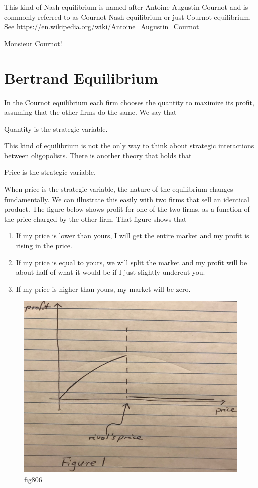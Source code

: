 \documentclass[
]{book}
\providecommand{\tightlist}{%
  \setlength{\itemsep}{0pt}\setlength{\parskip}{0pt}}
\begin{document}
This kind of Nash equilibrium is named after Antoine Augustin Cournot and is commonly referred to as Cournot Nash equilibrium or just Cournot equilibrium. See \url{https://en.wikipedia.org/wiki/Antoine_Augustin_Cournot}

Monsieur Cournot!

\hypertarget{bertrand-equilibrium}{%
\section{Bertrand Equilibrium}\label{bertrand-equilibrium}}

In the Cournot equilibrium each firm chooses the quantity to maximize its profit, assuming that the other firms do the same. We say that

\begin{center}
Quantity is the strategic variable.

\end{center}

This kind of equilibrium is not the only way to think about strategic interactions between oligopolists. There is another theory that holds that

\begin{center}
Price is the strategic variable.

\end{center}

When price is the strategic variable, the nature of the equilibrium changes fundamentally. We can illustrate this easily with two firms that sell an identical product. The figure below shows profit for one of the two firms, as a function of the price charged by the other firm. That figure shows that

\begin{enumerate}
\def\labelenumi{\arabic{enumi}.}
\tightlist
\item
  If my price is lower than yours, I will get the entire market and my profit is rising in the price.
\item
  If my price is equal to yours, we will split the market and my profit will be about half of what it would be if I just slightly undercut you.
\item
  If my price is higher than yours, my market will be zero.
\end{enumerate}

\begin{figure}

{\centering \includegraphics[width=0.5\linewidth]{img/ch8/fig6} 

}

\caption{fig806}\label{fig:fig806}
\end{figure}
\end{document}
